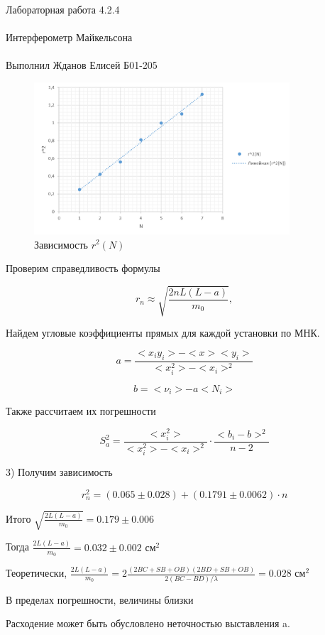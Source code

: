\documentclass{astroedu-lab}
\begin{document}
\begin{problem}{\huge Лабораторная работа 4.2.4\\\\Интерферометр Майкельсона\\\\Выполнил Жданов Елисей Б01-205}
\begin{figure}[h]
		\begin{center}
			\includegraphics[width = 0.85\textwidth]{гр2.png}
			\caption{Зависимость $r^2(N)$}
		\end{center}
	\end{figure}
	
\newpage

Проверим справедливость формулы

$$
r_n \approx \sqrt{\frac{2 n L(L-a)}{m_0}},
$$

Найдем угловые коэффициенты прямых для каждой установки по МНК.

\[
	a = \frac{<x_i y_i> - < x > < y_i >}{< x_i^2> - < x_i >^2}
\]

\[
	b = < \nu_i > - a < N_i >
\]

Также рассчитаем их погрешности

\begin{equation}
	S_a^2 = \frac{< x_i^2>}{< x_i^2 > - < x_i >^2} \cdot \frac{<  b_i - b > ^2}{n - 2}
\end{equation}

3) Получим зависимость

\begin{equation}
	r_n^2 = (0.065 \pm 0.028) + (0.1791 \pm 0.0062)\cdot n
\end{equation}

Итого $\sqrt{\frac{2 L(L-a)}{m_0}} = 0.179 \pm 0.006$

Тогда $\frac{2 L(L-a)}{m_0} = 0.032 \pm 0.002 \text{ см}^2$

Теоретически, $\frac{2 L(L-a)}{m_0} = 2 \frac{(2 BC + SB + OB)(2 BD + SB + OB)}{2(BC-BD)/\lambda} = 0.028 \text{ см}^2$

В пределах погрешности, величины близки

Расходение может быть обусловлено неточностью выставления a.


\end{problem}
\end{document}
